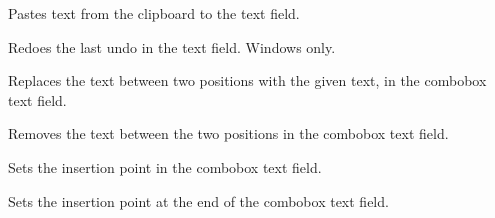 
Pastes text from the clipboard to the text field.


\label{wxcomboboxredo}


Redoes the last undo in the text field. Windows only.


\label{wxcomboboxreplace}


Replaces the text between two positions with the given text, in the combobox text field.






\label{wxcomboboxremove}


Removes the text between the two positions in the combobox text field.





\label{wxcomboboxsetinsertionpoint}


Sets the insertion point in the combobox text field.




\label{wxcomboboxsetinsertionpointend}


Sets the insertion point at the end of the combobox text field.


\label{wxcomboboxsetselection}


